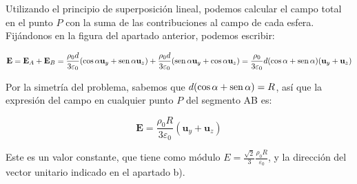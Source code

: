\begin{enumerate}
    Utilizando el principio de superposición lineal, podemos calcular el campo total en el punto $P$ con la suma de las contribuciones
    al campo de cada esfera. Fijándonos en la figura del apartado anterior, podemos escribir:

    \begin{equation*}
        \mathbf{E} = \mathbf{E}_A + \mathbf{E}_B = \frac{\rho_0 d}{3 \varepsilon_0} (\cos\alpha \mathbf{u}_y + \operatorname{sen}\alpha \mathbf{u}_z)
        + \frac{\rho_0 d}{3 \varepsilon_0} (\operatorname{sen}\alpha \mathbf{u}_y + \cos\alpha \mathbf{u}_z) =
        \frac{\rho_0}{3 \varepsilon_0} d (\cos\alpha + \operatorname{sen}\alpha) (\mathbf{u}_y + \mathbf{u}_z)
    \end{equation*}

    Por la simetría del problema, sabemos que $d (\cos\alpha + \operatorname{sen}\alpha) = R$, así que la expresión del campo en cualquier punto
    $P$ del segmento AB es:

    \begin{equation*}
        \mathbf{E} =  \frac{\rho_0 R}{3 \varepsilon_0} (\mathbf{u}_y + \mathbf{u}_z)
    \end{equation*}

    Este es un valor constante, que tiene como módulo $E = \frac{\sqrt{2}}{3} \frac{\rho_0 R}{\varepsilon_0}$, y la dirección del vector
    unitario indicado en el apartado b).

\end{enumerate}